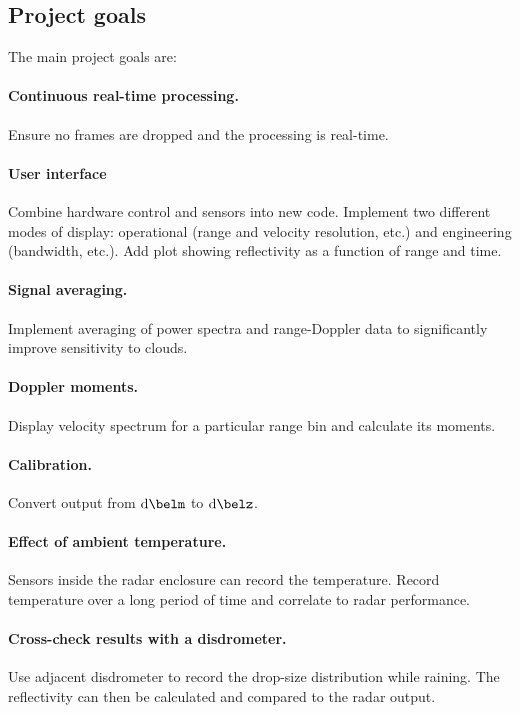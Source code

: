 \documentclass{article}
\begin{document}
\subsection{Project goals}
The main project goals are:
\paragraph{Continuous real-time processing.} Ensure no frames are dropped and the processing is real-time.

\paragraph{User interface} Combine hardware control and sensors into new code. Implement two different modes of display: operational (range and velocity resolution, etc.) and engineering (bandwidth, etc.). Add plot showing reflectivity as a function of range and time.

\paragraph{Signal averaging.} Implement averaging of power spectra and range-Doppler data to significantly improve sensitivity to clouds.

\paragraph{Doppler moments.} Display velocity spectrum for a particular range bin and calculate its moments.

\paragraph{Calibration.} Convert output from \(\si{\deci\belm}\) to \(\si{\deci\belz}\).

\paragraph{Effect of ambient temperature.} Sensors inside the radar enclosure can record the temperature. Record temperature over a long period of time and correlate to radar performance.

\paragraph{Cross-check results with a disdrometer.} Use adjacent disdrometer to record the drop-size distribution while raining. The reflectivity can then be calculated and compared to the radar output.
\end{document}
